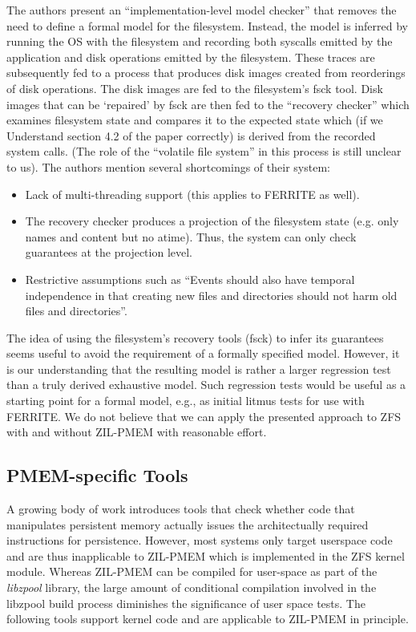 \documentclass[12pt,a4paper,twoside]{book}
\begin{document}
The authors present an “implementation-level model checker” that removes the need to define a formal model for the filesystem.
Instead, the model is inferred by running the OS with the filesystem and recording both syscalls emitted by the application and disk operations emitted by the filesystem.
These traces are subsequently fed to a process that produces disk images created from reorderings of disk operations.
The disk images are fed to the filesystem’s fsck tool.
Disk images that can be ‘repaired’ by fsck are then fed to the “recovery checker” which examines filesystem state and compares it to the expected state which (if we Understand section 4.2 of the paper correctly) is derived from the recorded system calls.
(The role of the “volatile file system” in this process is still unclear to us).
The authors mention several shortcomings of their system:
\begin{itemize}[noitemsep,beginpenalty=100000,midpenalty=100000]
    \item Lack of multi-threading support (this applies to FERRITE as well).
    \item The recovery checker produces a projection of the filesystem state (e.g. only names and content but no atime).
          Thus, the system can only check guarantees at the projection level.
    \item Restrictive assumptions such as “Events should also have temporal independence in that creating new files and directories should not harm old files and directories”.
\end{itemize}
The idea of using the filesystem’s recovery tools (fsck) to infer its guarantees seems useful to avoid the requirement of a formally specified model.
However, it is our understanding that the resulting model is rather a larger regression test than a truly derived exhaustive model.
Such regression tests would be useful as a starting point for a formal model, e.g., as initial litmus tests for use with FERRITE.
We do not believe that we can apply the presented approach to ZFS with and without ZIL-PMEM with reasonable effort.

\subsection{PMEM-specific Tools}\label{sec:rel_work:pmemspecifictools}
A growing body of work introduces tools that check whether code that manipulates persistent memory actually issues the architectually required instructions for persistence.
However, most systems only target userspace code and are thus inapplicable to ZIL-PMEM which is implemented in the ZFS kernel module.
Whereas ZIL-PMEM can be compiled for user-space as part of the \textit{libzpool} library, the large amount of conditional compilation involved in the libzpool build process diminishes the significance of user space tests.
The following tools support kernel code and are applicable to ZIL-PMEM in principle.
\end{document}
